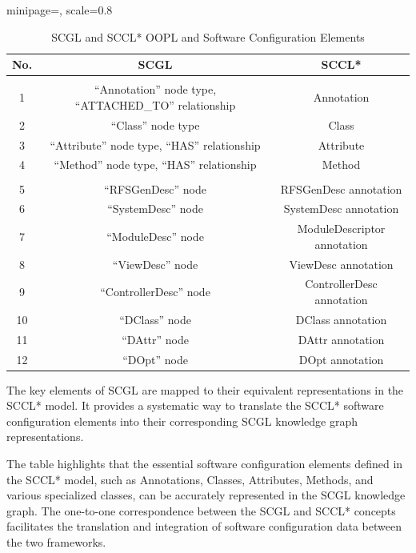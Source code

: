 \documentclass[runningheads]{llncs}
\begin{document}
\begin{table}[h!]
\centering
\begin{adjustbox}{minipage=\textwidth, scale=0.8}

\caption{SCGL and SCCL* OOPL and Software Configuration Elements}
\begin{tabular}{|c|c|c|}
\hline \rowcolor[gray]{0.8}%
\textbf{No.} & \textbf{SCGL} & \textbf{SCCL*} \\ \hline \rowcolor[gray]{0.8}%
\multicolumn{3}{|c|}{\textbf{OOPL Elements}} \\ \hline
1 & ``Annotation'' node type, “ATTACHED\_TO” relationship & Annotation \\ \hline
2 & “Class” node type & Class \\ \hline
3 & “Attribute” node type, “HAS” relationship & Attribute \\ \hline
4 & “Method” node type, “HAS” relationship & Method \\ \hline  \rowcolor[gray]{0.8}%
\multicolumn{3}{|c|}{\textbf{Software Configuration Elements}} \\ \hline
5 & “RFSGenDesc” node & RFSGenDesc annotation \\ \hline
6 & “SystemDesc” node & SystemDesc annotation \\ \hline
7 & “ModuleDesc” node & ModuleDescriptor annotation \\ \hline
8 & “ViewDesc” node & ViewDesc annotation \\ \hline
9 & “ControllerDesc” node & ControllerDesc annotation \\ \hline
10 & “DClass” node & DClass annotation \\ \hline
11 & “DAttr” node & DAttr annotation \\ \hline
12 & “DOpt” node & DOpt annotation \\ \hline
\end{tabular}


\end{adjustbox}
\end{table}
The key elements of SCGL are mapped to their equivalent representations in the SCCL* model. It provides a systematic way to translate the SCCL* software configuration elements into their corresponding SCGL knowledge graph representations. 

The table highlights that the essential software configuration elements defined in the SCCL* model, such as Annotations, Classes, Attributes, Methods, and various specialized classes, can be accurately represented in the SCGL knowledge graph. The one-to-one correspondence between the SCGL and SCCL* concepts facilitates the translation and integration of software configuration data between the two frameworks.
\end{document}
